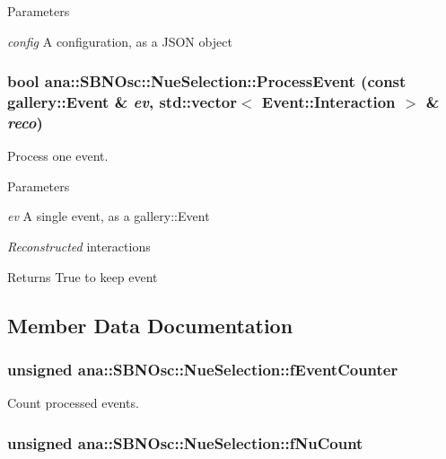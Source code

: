 \begin{DoxyParams}{Parameters}
\item[{\em config}]A configuration, as a JSON object \end{DoxyParams}
\hypertarget{classana_1_1SBNOsc_1_1NueSelection_a5c633a75ee3f7bdbcb5b09c253595377}{
\subsubsection[{ProcessEvent}]{\setlength{\rightskip}{0pt plus 5cm}bool ana::SBNOsc::NueSelection::ProcessEvent (const gallery::Event \& {\em ev}, \/  std::vector$<$ Event::Interaction $>$ \& {\em reco})}}
\label{classana_1_1SBNOsc_1_1NueSelection_a5c633a75ee3f7bdbcb5b09c253595377}
Process one event.


\begin{DoxyParams}{Parameters}
\item[{\em ev}]A single event, as a gallery::Event \item[{\em Reconstructed}]interactions \end{DoxyParams}
\begin{DoxyReturn}{Returns}
True to keep event 
\end{DoxyReturn}


\subsection{Member Data Documentation}
\hypertarget{classana_1_1SBNOsc_1_1NueSelection_afabc5bb1bf5a7a99313f4e12c335e99c}{
\subsubsection[{fEventCounter}]{\setlength{\rightskip}{0pt plus 5cm}unsigned {\bf ana::SBNOsc::NueSelection::fEventCounter}}}
\label{classana_1_1SBNOsc_1_1NueSelection_afabc5bb1bf5a7a99313f4e12c335e99c}


Count processed events. \hypertarget{classana_1_1SBNOsc_1_1NueSelection_aead1cb7ecd90992089e49372489c14f7}{
\subsubsection[{fNuCount}]{\setlength{\rightskip}{0pt plus 5cm}unsigned {\bf ana::SBNOsc::NueSelection::fNuCount}}}
\label{classana_1_1SBNOsc_1_1NueSelection_aead1cb7ecd90992089e49372489c14f7}


